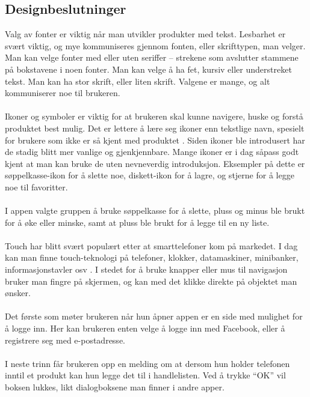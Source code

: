 
\subsection{Designbeslutninger}
Valg av fonter er viktig når man utvikler produkter med tekst. Lesbarhet er svært viktig, og mye kommuniseres gjennom fonten, eller skrifttypen, man velger. Man kan velge fonter med eller uten seriffer – strekene som avslutter stammene på bokstavene i noen fonter. Man kan velge å ha fet, kursiv eller understreket tekst. Man kan ha stor skrift, eller liten skrift. Valgene er mange, og alt kommuniserer noe til brukeren.
\\\\
Ikoner og symboler er viktig for at brukeren skal kunne navigere, huske og forstå produktet best mulig. Det er lettere å lære seg ikoner enn tekstlige navn, spesielt for brukere som ikke er så kjent med produktet \cite[p.~171]{preece}. Siden ikoner ble introdusert har de stadig blitt mer vanlige og gjenkjennbare. Mange ikoner er i dag såpass godt kjent at man kan bruke de uten nevneverdig introduksjon. Eksempler på dette er søppelkasse-ikon for å slette noe, diskett-ikon for å lagre, og stjerne for å legge noe til favoritter. 
\\\\
I appen valgte gruppen å bruke søppelkasse for å slette, pluss og minus ble brukt for å øke eller minske, samt at pluss ble brukt for å legge til en ny liste.
\\\\
Touch har blitt svært populært etter at smarttelefoner kom på markedet. I dag kan man finne touch-teknologi på telefoner, klokker, datamaskiner, minibanker,  informasjonstavler osv \cite[p.~197]{preece}. I stedet for å bruke knapper eller mus til navigasjon bruker man fingre på skjermen, og kan med det klikke direkte på objektet man ønsker. 
\\\\
Det første som møter brukeren når hun åpner appen er en side med mulighet for å logge inn. Her kan brukeren enten velge å logge inn med Facebook, eller å registrere seg med e-postadresse.
\\\\
I neste trinn får brukeren opp en melding om at dersom hun holder telefonen inntil et produkt kan hun legge det til i handlelisten. Ved å trykke “OK” vil boksen lukkes, likt dialogboksene man finner i andre apper.
\\\\
